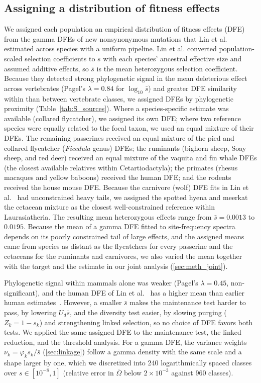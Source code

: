 \documentclass{article}
\begin{document}
\subsection{Assigning a distribution of fitness effects}\label{sec:dfe_methods}
We assigned each population an empirical distribution of fitness effects (DFE) from the gamma DFEs of new nonsynonymous mutations that Lin et al.~\cite{lin2026} estimated across species with a uniform pipeline. Lin et al. converted population-scaled selection coefficients to $s$ with each species' ancestral effective size and assumed additive effects, so $\bar{s}$ is the mean heterozygous selection coefficient. Because they detected strong phylogenetic signal in the mean deleterious effect across vertebrates (Pagel's $\lambda = 0.84$ for $\log_{10}\bar{s}$) and greater DFE similarity within than between vertebrate classes, we assigned DFEs by phylogenetic proximity (Table~\ref{tab:S_sources}). Where a species-specific estimate was available (collared flycatcher), we assigned its own DFE; where two reference species were equally related to the focal taxon, we used an equal mixture of their DFEs. The remaining passerines received an equal mixture of the pied and collared flycatcher (\emph{Ficedula} genus) DFEs; the ruminants (bighorn sheep, Soay sheep, and red deer) received an equal mixture of the vaquita and fin whale DFEs (the closest available relatives within Cetartiodactyla); the primates (rhesus macaques and yellow baboons) received the human DFE; and the rodents received the house mouse DFE. Because the carnivore (wolf) DFE fits in Lin et al.~\cite{lin2026} had unconstrained heavy tails, we assigned the spotted hyena and meerkat the cetacean mixture as the closest well-constrained reference within Laurasiatheria. The resulting mean heterozygous effects range from $\bar{s} = 0.0013$ to $0.0195$. Because the mean of a gamma DFE fitted to site-frequency spectra depends on its poorly constrained tail of large effects, and the assigned means came from species as distant as the flycatchers for every passerine and the cetaceans for the ruminants and carnivores, we also varied the mean together with the target and the estimate in our joint analysis (\autoref{sec:meth_joint}).

Phylogenetic signal within mammals alone was weaker (Pagel's $\lambda = 0.45$, non-significant), and the human DFE of Lin et al.~\cite{lin2026} has a higher mean than earlier human estimates~\cite{kim2017}. However, a smaller $\bar{s}$ makes the maintenance test harder to pass, by lowering $U_d\bar{s}$, and the diversity test easier, by slowing purging ($Z_k = 1 - s_k$) and strengthening linked selection, so no choice of DFE favors both tests. We applied the same assigned DFE to the maintenance test, the linked reduction, and the threshold analysis. For a gamma DFE, the variance weights $\nu_k = \varphi_ks_k/\bar{s}$ (\autoref{sec:linkage}) follow a gamma density with the same scale and a shape larger by one, which we discretized into 240 logarithmically spaced classes over $s \in [10^{-8}, 1]$ (relative error in $\overline{\Omega}$ below $2\times10^{-3}$ against 960 classes).
\end{document}
